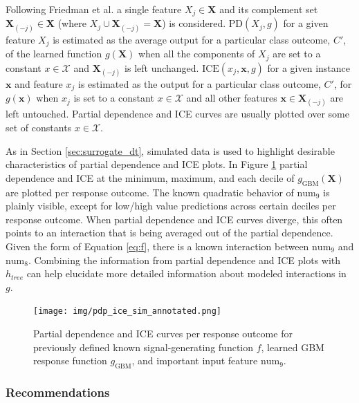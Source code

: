 \documentclass{article}
\begin{document}
Following Friedman et al. a single feature $X_j \in \mathbf{X}$ and its complement set $\mathbf{X}_{(-j)} \in \mathbf{X}$ (where $X_j \cup \mathbf{X}_{(-j)} = \mathbf{X}$) is considered. $\text{PD}(X_j, g)$ for a given feature $X_j$ is estimated as the average output for a particular class outcome, $C'$, of the learned function $g(\mathbf{X})$ when all the components of $X_j$ are set to a constant $x \in \mathcal{X}$ and $\mathbf{X}_{(-j)}$ is left unchanged. $\text{ICE}(x_j, \mathbf{x}, g)$ for a given instance $\mathbf{x}$ and feature $x_j$ is estimated as the output for a particular class outcome, $C'$, for $g(\mathbf{x})$ when $x_j$ is set to a constant $x \in \mathcal{X}$ and all other features $\mathbf{x} \in \mathbf{X}_{(-j)}$ are left untouched. Partial dependence and ICE curves are usually plotted over some set of constants $x \in \mathcal{X}$. 

As in Section \ref{sec:surrogate_dt}, simulated data is used to highlight desirable characteristics of partial dependence and ICE plots. In Figure \ref{fig:global_pdp_ice} partial dependence and ICE at the minimum, maximum, and each decile of $g_{\text{GBM}}(\mathbf{X})$ are plotted per response outcome. The known quadratic behavior of $\text{num}_9$ is plainly visible, except for low/high value predictions across certain deciles per response outcome. When partial dependence and ICE curves diverge, this often points to an interaction that is being averaged out of the partial dependence. Given the form of Equation \ref{eq:f}, there is a known interaction between $\text{num}_9$ and $\text{num}_8$. Combining the information from partial dependence and ICE plots with $h_{tree}$ can help elucidate more detailed information about modeled interactions in $g$.

\begin{figure}[!htbp]
	\begin{center}
		\texttt{[image: img/pdp\_ice\_sim\_annotated.png]}
    \caption{Partial dependence and ICE curves per response outcome for previously defined known signal-generating function $f$,  learned GBM response function $g_{\text{GBM}}$, and important input feature $\text{num}_9$.}
    \label{fig:global_pdp_ice}
	\end{center}
\end{figure}
\FloatBarrier

\subsubsection{Recommendations}
\end{document}
